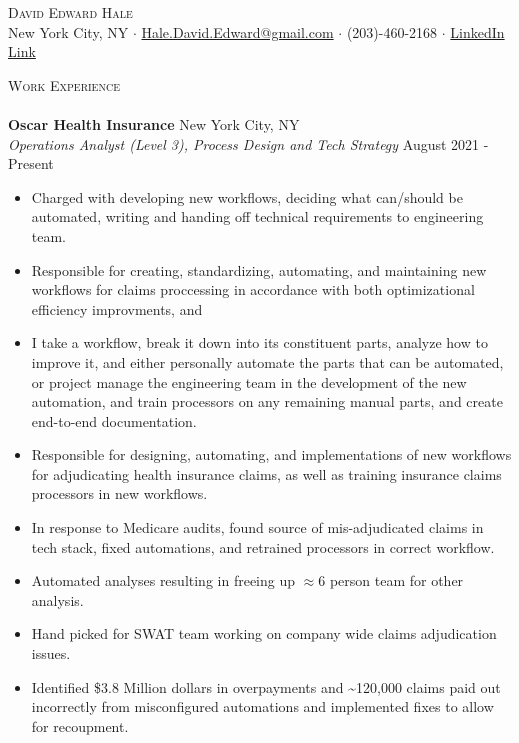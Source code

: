 \documentclass[a4paper]{article}
\newcommand{\lineunder} {
    \vspace*{-8pt} \\
    \hspace*{-18pt} \hrulefill \\
}
\newcommand{\header} [1] {
    {\hspace*{-18pt}\vspace*{6pt} \textsc{#1}}
    \vspace*{-6pt} \lineunder
}
\begin{document}
\vspace*{-40pt}

    

\vspace*{-9pt}
\begin{center}
	{\Large \scshape {David Edward Hale}}\\
	New York City, NY $\cdot$ \href{mailto:Hale.David.Edward@gmail.com}{Hale.David.Edward@gmail.com} $\cdot$ (203)-460-2168 $\cdot$ \href{http://linkedin.com/in/david-hale-2598a791/}{LinkedIn Link}\\
\end{center}

\header{Work Experience}
\vspace{1mm}
\textbf{Oscar Health Insurance} \hfill New York City, NY\\
\textit{Operations Analyst (Level 3), Process Design and Tech Strategy} \hfill August 2021 - Present\\
\vspace{-1mm}
\begin{itemize} \itemsep 1pt

    \item   Charged with developing new workflows, deciding what can/should be automated, writing and handing off technical requirements to engineering team. 

    \item   Responsible for creating, standardizing, automating, and maintaining new workflows for claims proccessing in accordance with both optimizational efficiency improvments, and 
	\item 	I take a workflow, break it down into its constituent parts, analyze how to improve it, and either personally automate the parts that can be automated, or project manage the engineering team in the development of the new automation, and train processors on any remaining manual parts, and create end-to-end documentation.
	\item 	Responsible for designing, automating, and implementations of new workflows for adjudicating health insurance claims, as well as training insurance claims processors in new workflows.
	\item 	In response to Medicare audits, found source of mis-adjudicated claims in tech stack, fixed automations, and retrained processors in correct workflow.
	\item 	Automated analyses resulting in freeing up $\approx{6}$ person team for other analysis.
	\item 	Hand picked for SWAT team working on company wide claims adjudication issues.
	\item 	Identified \$3.8 Million dollars in overpayments and \textasciitilde{}120,000 claims paid out incorrectly from misconfigured automations and implemented fixes to allow for recoupment.
\end{itemize}
\end{document}
